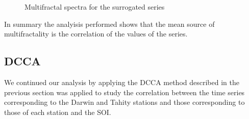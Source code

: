 \documentclass[onecolumn, preprint,aps,amsmath, amssymb, superscriptaddress]{revtex4}
\begin{document}
\begin{figure}
\caption{Multifractal spectra for the surrogated series}
\label{fig:h-hsurr}
\end{figure}


In summary the analyisis performed shows that the mean source of multifractality is the correlation of the values of the series.



\subsection{DCCA}
\label{results_dcca}

We continued our analysis by applying the DCCA method described in the previous section was applied to study the correlation between the time series corresponding to the Darwin and Tahity stations and those corresponding to those of each station and the SOI.
\end{document}

